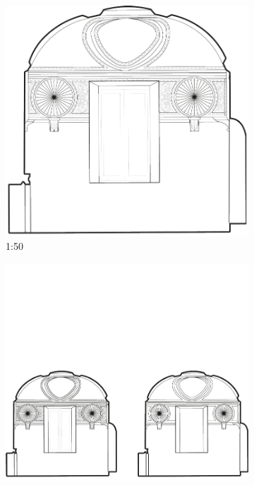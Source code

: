 \begin{figure}[h!tbp]\vspace{1cm}
\centering
\begin{subfigure}{.5\textwidth}
  \centering
  \includegraphics[width=.98\linewidth]{bilder/vektor_massstaeblichkeitCAD-1-50.pdf}
  \caption{1:50}
\end{subfigure}%
\begin{subfigure}{.5\textwidth}
  \centering
  \includegraphics[width=.98\linewidth]{bilder/vektor_massstaeblichkeitCAD-1-100.pdf}

\end{subfigure}
\end{figure}
